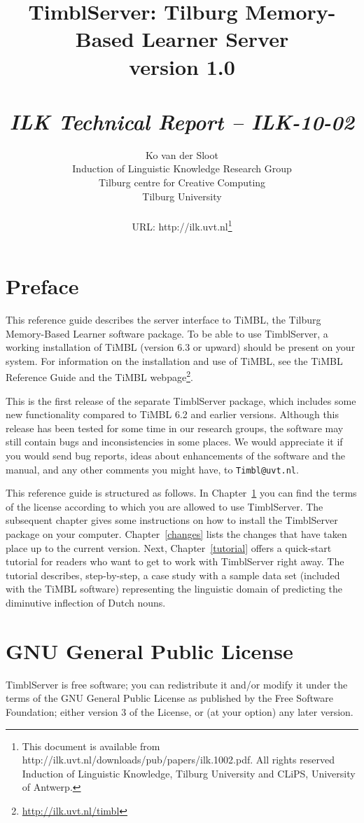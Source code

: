 \documentclass{report}
\author{Ko van der Sloot \\
	Induction of Linguistic Knowledge Research Group\\
	Tilburg centre for Creative Computing\\
        Tilburg University \\ \\
       URL: http://ilk.uvt.nl\thanks{This document is available from
	http://ilk.uvt.nl/downloads/pub/papers/ilk.1002.pdf. All rights reserved
	Induction of Linguistic Knowledge, Tilburg University and 
        CLiPS, University of Antwerp.}}
\title{{\huge TimblServer: Tilburg Memory-Based Learner Server} \\ \vspace*{0.5cm}
{\bf version 1.0} \\ \vspace*{0.5cm}{\huge Manual}\\
\vspace*{1cm} {\it ILK Technical Report -- ILK-10-02}}
\begin{document}

\maketitle

\tableofcontents

\chapter*{Preface}

This reference guide describes the server interface to TiMBL, the
Tilburg Memory-Based Learner software package. To be able to use
TimblServer, a working installation of TiMBL (version 6.3 or upward)
should be present on your system. For information on the installation
and use of TiMBL, see the TiMBL Reference Guide \cite{Daelemans+10}
and the TiMBL webpage\footnote{\url{http://ilk.uvt.nl/timbl}}.

This is the first release of the separate TimblServer package, which
includes some new functionality compared to TiMBL 6.2 and earlier
versions.  Although this release has been tested for some time in our
research groups, the software may still contain bugs and
inconsistencies in some places. We would appreciate it if you would
send bug reports, ideas about enhancements of the software and the
manual, and any other comments you might have, to {\tt Timbl@uvt.nl}.

This reference guide is structured as follows. In
Chapter~\ref{license} you can find the terms of the license according
to which you are allowed to use TimblServer. The subsequent chapter gives
some instructions on how to install the TimblServer package on your
computer. Chapter~\ref{changes} lists the changes that have taken
place up to the current version. Next, Chapter~\ref{tutorial} offers a
quick-start tutorial for readers who want to get to work with TimblServer
right away. The tutorial describes, step-by-step, a case study with a
sample data set (included with the TiMBL software) representing the
linguistic domain of predicting the diminutive inflection of Dutch
nouns. 

\chapter{GNU General Public License}
\label{license}

TimblServer is free software; you can redistribute it and/or modify it under the terms of the GNU General Public License as published by the Free Software Foundation; either version 3 of the License, or (at your option) any later version.
\end{document}
